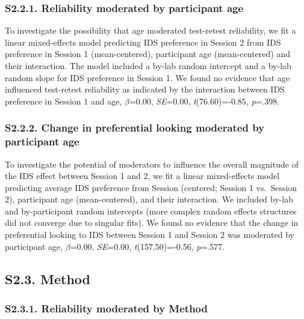 \documentclass[
  man, donotrepeattitle,floatsintext]{apa6}
\begin{document}
\hypertarget{s2.2.1.-reliability-moderated-by-participant-age}{%
\subsubsection{S2.2.1. Reliability moderated by participant age}\label{s2.2.1.-reliability-moderated-by-participant-age}}

To investigate the possibility that age moderated test-retest reliability, we fit a linear mixed-effects model predicting IDS preference in Session 2 from IDS preference in Session 1 (mean-centered), participant age (mean-centered) and their interaction.
The model included a by-lab random intercept and a by-lab random slope for IDS preference in Session 1.
We found no evidence that age influenced test-retest reliability as indicated by the interaction between IDS preference in Session 1 and age, \(\beta\)=0.00, \emph{SE}=0.00, \emph{t}(76.60)=-0.85, \emph{p}=.398.

\hypertarget{s2.2.2.-change-in-preferential-looking-moderated-by-participant-age}{%
\subsubsection{S2.2.2. Change in preferential looking moderated by participant age}\label{s2.2.2.-change-in-preferential-looking-moderated-by-participant-age}}

To investigate the potential of moderators to influence the overall magnitude of the IDS effect between Session 1 and 2, we fit a linear mixed-effects model predicting average IDS preference from Session (centered; Session 1 vs.~Session 2), participant age (mean-centered), and their interaction.
We included by-lab and by-participant random intercepts (more complex random effects structures did not converge due to singular fits).
We found no evidence that the change in preferential looking to IDS between Session 1 and Session 2 was moderated by participant age, \(\beta\)=0.00, \emph{SE}=0.00, \emph{t}(157.50)=-0.56, \emph{p}=.577.

\hypertarget{s2.3.-method}{%
\subsection{S2.3. Method}\label{s2.3.-method}}

\hypertarget{s2.3.1.-reliability-moderated-by-method}{%
\subsubsection{S2.3.1. Reliability moderated by Method}\label{s2.3.1.-reliability-moderated-by-method}}
\end{document}
